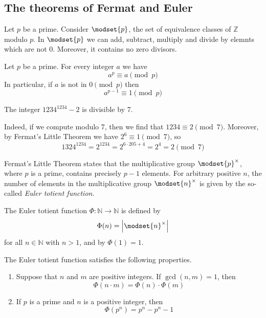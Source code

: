 \subsection{The theorems of Fermat and Euler}
Let $p$ be a prime. Consider $ \modset{p} $, the set of equivalence classes
of $ \mathbb{Z} $ modulo $p$. In $ \modset{p} $ we can add, subtract, multiply
and divide by elemnts which are not 0. Moreover, it contains no zero divisors.

\begin{theorem}
    Let $p$ be a prime. For every integer $a$ we have
    $$ a^p \equiv a \pmod{p} $$
    In particular, if $a$ is not in $ 0 \pmod{p} $ then
    $$ a^{p-1} \equiv 1 \pmod{p} $$
\end{theorem}

\begin{example}
    The integer $ 1234^1234 - 2 $ is divisible by 7.

    Indeed, if we compute modulo 7, then we find that $ 1234 \equiv 2 \pmod{7} $.
    Moreover, by Fermat's Little Theorem we have $ 2^6 \equiv 1 \pmod{7} $, so
    $$ 1324^1234 = 2^1234 = 2^{6 \cdot 205 + 4} = 2^4 = 2 \pmod{7} $$
\end{example}

Fermat's Little Theorem states that the multiplicative group
$ \modset{p}^\times $, where $p$ is a prime, contains precisely $p-1$
elements. For arbitrary positive $n$, the number of elements in the multiplicative
group $ \modset{n}^\times $ is given by the so-called \emph{Euler totient function}.

\begin{definition}
    The Euler totient function $ \Phi: \mathbb{N} \to \mathbb{N} $ is defined
    by $$ \Phi(n) = \left\vert\modset{n}^\times\right\vert $$
    for all $ n \in \mathbb{N} $ with $ n > 1 $, and by $ \Phi(1) = 1 $.
\end{definition}

\begin{theorem}
    The Euler totient function satisfies the following properties.
    \begin{enumerate}
        \item Suppose that $n$ and $m$ are positive integers. If $ \gcd(n,m) = 1 $,
        then $$ \Phi(n \cdot m) = \Phi(n) \cdot \Phi(m) $$

        \item If $p$ is a prime and $n$ is a positive integer, then
        $$ \Phi(p^n) = p^n - p^n-1 $$
    \end{enumerate}
\end{theorem}

